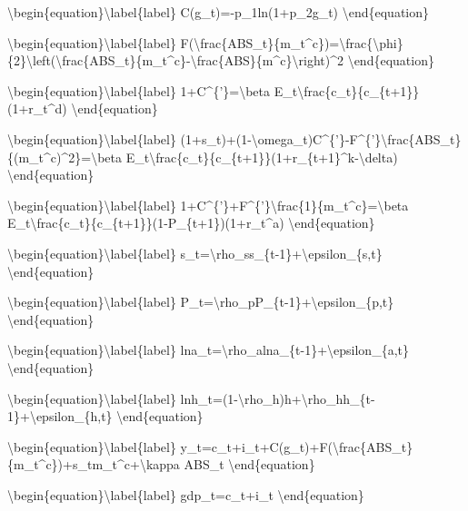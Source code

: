 \documentclass[10pt,math=newtx,citestyle=gb7714-2015,bibstyle=gb7714-2015]{elegantbook}
\begin{document}
	\textbackslash{}begin\{equation\}\textbackslash{}label\{label\}
	C(g\_t)=-p\_1ln(1+p\_2g\_t)
	\textbackslash{}end\{equation\}
	
	\textbackslash{}begin\{equation\}\textbackslash{}label\{label\}
	F(\textbackslash{}frac\{ABS\_t\}\{m\_t\^{}c\})=\textbackslash{}frac\{\textbackslash{}phi\}\{2\}\textbackslash{}left(\textbackslash{}frac\{ABS\_t\}\{m\_t\^{}c\}-\textbackslash{}frac\{ABS\}\{m\^{}c\}\textbackslash{}right)\^{}2
	\textbackslash{}end\{equation\}
	
	\textbackslash{}begin\{equation\}\textbackslash{}label\{label\}
	1+C\^{}\{'\}=\textbackslash{}beta E\_t\textbackslash{}frac\{c\_t\}\{c\_\{t+1\}\}(1+r\_t\^{}d)
	\textbackslash{}end\{equation\}
	
	\textbackslash{}begin\{equation\}\textbackslash{}label\{label\}
	(1+s\_t)+(1-\textbackslash{}omega\_t)C\^{}\{'\}-F\^{}\{'\}\textbackslash{}frac\{ABS\_t\}\{(m\_t\^{}c)\^{}2\}=\textbackslash{}beta E\_t\textbackslash{}frac\{c\_t\}\{c\_\{t+1\}\}(1+r\_\{t+1\}\^{}k-\textbackslash{}delta)
	\textbackslash{}end\{equation\}
	
	\textbackslash{}begin\{equation\}\textbackslash{}label\{label\}
	1+C\^{}\{'\}+F\^{}\{'\}\textbackslash{}frac\{1\}\{m\_t\^{}c\}=\textbackslash{}beta E\_t\textbackslash{}frac\{c\_t\}\{c\_\{t+1\}\}(1-P\_\{t+1\})(1+r\_t\^{}a)
	\textbackslash{}end\{equation\}
	
	\textbackslash{}begin\{equation\}\textbackslash{}label\{label\}
	s\_t=\textbackslash{}rho\_ss\_\{t-1\}+\textbackslash{}epsilon\_\{s,t\}
	\textbackslash{}end\{equation\}
	
	\textbackslash{}begin\{equation\}\textbackslash{}label\{label\}
	P\_t=\textbackslash{}rho\_pP\_\{t-1\}+\textbackslash{}epsilon\_\{p,t\}
	\textbackslash{}end\{equation\}
	
	\textbackslash{}begin\{equation\}\textbackslash{}label\{label\}
	lna\_t=\textbackslash{}rho\_alna\_\{t-1\}+\textbackslash{}epsilon\_\{a,t\}
	\textbackslash{}end\{equation\}
	
	\textbackslash{}begin\{equation\}\textbackslash{}label\{label\}
	lnh\_t=(1-\textbackslash{}rho\_h)h+\textbackslash{}rho\_hh\_\{t-1\}+\textbackslash{}epsilon\_\{h,t\}
	\textbackslash{}end\{equation\}
	
	\textbackslash{}begin\{equation\}\textbackslash{}label\{label\}
	y\_t=c\_t+i\_t+C(g\_t)+F(\textbackslash{}frac\{ABS\_t\}\{m\_t\^{}c\})+s\_tm\_t\^{}c+\textbackslash{}kappa ABS\_t
	\textbackslash{}end\{equation\}
	
	\textbackslash{}begin\{equation\}\textbackslash{}label\{label\}
	gdp\_t=c\_t+i\_t
	\textbackslash{}end\{equation\}
	
\end{document}
